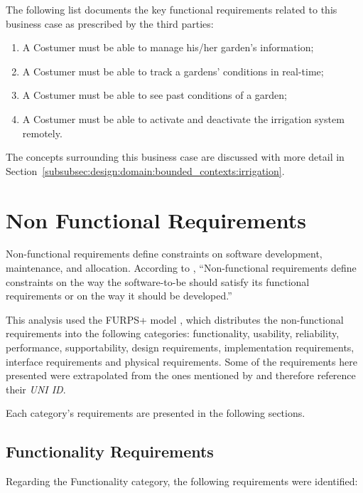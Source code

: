 The following list documents the key functional requirements related to this business case as prescribed by the third parties:

\begin{enumerate}
    \item A Costumer must be able to manage his/her garden's information;
    \item A Costumer must be able to track a gardens' conditions in real-time;
    \item A Costumer must be able to see past conditions of a garden;
    \item A Costumer must be able to activate and deactivate the irrigation system remotely.
\end{enumerate}

The concepts surrounding this business case are discussed with more detail in Section~\ref{subsubsec:design:domain:bounded_contexts:irrigation}.

\section{Non Functional Requirements}
\label{sec:requirements:non_functional}

Non-functional requirements define constraints on software development, maintenance, and allocation.
According to \cite{van2009requirements}, “Non-functional requirements define constraints on the way the software-to-be should satisfy its functional requirements or on the way it should be developed.”

This analysis used the FURPS+ model \parencite{eeles2005capturing}, which distributes the non-functional requirements into the following categories: functionality, usability, reliability, performance, supportability, design requirements, implementation requirements, interface requirements and physical requirements. Some of the requirements here presented were extrapolated from the ones mentioned by \cite{iot-a} and therefore reference their \textit{UNI ID}.

Each category's requirements are presented in the following sections.

\subsection{Functionality Requirements}
\label{subsec:requirements:non_functional:functionality}

Regarding the Functionality category, the following requirements were identified:

